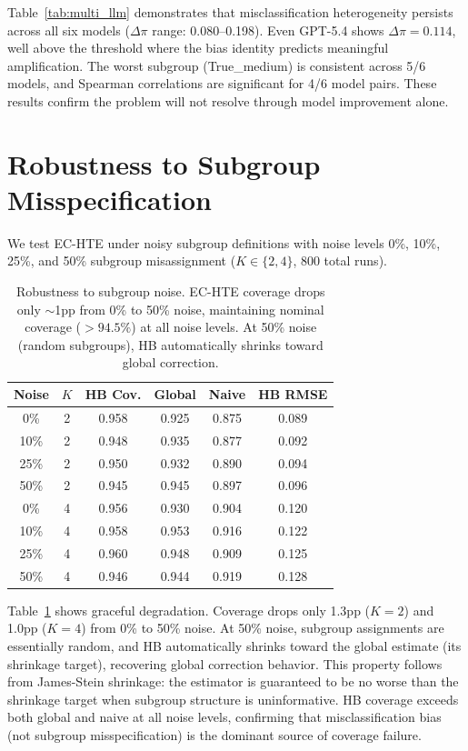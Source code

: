\documentclass[11pt,twocolumn]{article}
\begin{document}
Table~\ref{tab:multi_llm} demonstrates that misclassification heterogeneity persists across all six models ($\Delta\pi$ range: 0.080--0.198). Even GPT-5.4 shows $\Delta\pi = 0.114$, well above the threshold where the bias identity predicts meaningful amplification. The worst subgroup (True\_medium) is consistent across 5/6 models, and Spearman correlations are significant for 4/6 model pairs. These results confirm the problem will not resolve through model improvement alone.

\section{Robustness to Subgroup Misspecification}
\label{app:robustness}

We test EC-HTE under noisy subgroup definitions with noise levels 0\%, 10\%, 25\%, and 50\% subgroup misassignment ($K \in \{2, 4\}$, 800 total runs).

\begin{table}[t]
\centering
\caption{Robustness to subgroup noise. EC-HTE coverage drops only $\sim$1pp from 0\% to 50\% noise, maintaining nominal coverage ($>94.5\%$) at all noise levels. At 50\% noise (random subgroups), HB automatically shrinks toward global correction.}
\label{tab:robustness}
\small
\begin{tabular}{@{}cccccc@{}}
\toprule
Noise & $K$ & HB Cov. & Global & Naive & HB RMSE \\
\midrule
0\% & 2 & 0.958 & 0.925 & 0.875 & 0.089 \\
10\% & 2 & 0.948 & 0.935 & 0.877 & 0.092 \\
25\% & 2 & 0.950 & 0.932 & 0.890 & 0.094 \\
50\% & 2 & 0.945 & 0.945 & 0.897 & 0.096 \\
0\% & 4 & 0.956 & 0.930 & 0.904 & 0.120 \\
10\% & 4 & 0.958 & 0.953 & 0.916 & 0.122 \\
25\% & 4 & 0.960 & 0.948 & 0.909 & 0.125 \\
50\% & 4 & 0.946 & 0.944 & 0.919 & 0.128 \\
\bottomrule
\end{tabular}
\end{table}

Table~\ref{tab:robustness} shows graceful degradation. Coverage drops only 1.3pp ($K\!=\!2$) and 1.0pp ($K\!=\!4$) from 0\% to 50\% noise. At 50\% noise, subgroup assignments are essentially random, and HB automatically shrinks toward the global estimate (its shrinkage target), recovering global correction behavior. This property follows from James-Stein shrinkage: the estimator is guaranteed to be no worse than the shrinkage target when subgroup structure is uninformative. HB coverage exceeds both global and naive at all noise levels, confirming that misclassification bias (not subgroup misspecification) is the dominant source of coverage failure.
\end{document}
